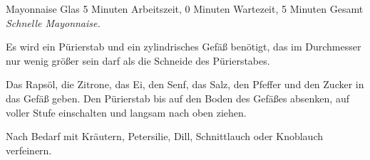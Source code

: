 \begin{recipe}{Mayonnaise} { Glas} {5 Minuten Arbeitszeit, 0 Minuten Wartezeit, 5 Minuten Gesamt}
  \freeform{}\textit{Schnelle Mayonnaise.}


  Es wird ein Pürierstab und ein zylindrisches Gefäß benötigt, das im Durchmesser nur wenig größer sein darf als die Schneide des Pürierstabes.

  Das Rapsöl, die Zitrone, das Ei, den Senf, das Salz, den Pfeffer und den Zucker in das Gefäß geben.
  Den Pürierstab bis auf den Boden des Gefäßes absenken, auf voller Stufe einschalten und langsam nach oben ziehen.

  Nach Bedarf mit Kräutern, Petersilie, Dill, Schnittlauch oder Knoblauch verfeinern.

  \freeform{}\hrulefill{}
\end{recipe}
